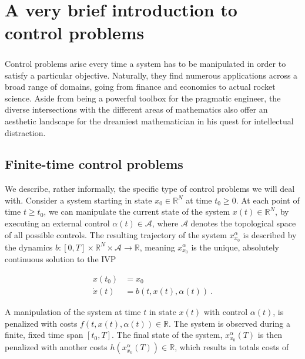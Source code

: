 \chapter{A very brief introduction to control problems} 

	\paragraph{}
	Control problems arise every time a system has to be manipulated in order to satisfy a particular objective. Naturally, they find numerous applications across a broad range of domains, going from finance and economics to actual rocket science. Aside from being a powerful toolbox for the pragmatic engineer, the diverse intersections with the different areas of mathematics also offer an aesthetic landscape for the dreamiest mathematician in his quest for intellectual distraction. 
	
	\section{Finite-time control problems}
	
	We describe, rather informally, the specific type of control problems we will deal with. Consider a system starting in state $ x_0 \in \mathbb{R}^N $ at time $ t_0 \geq 0 $. At each point of time $ t \geq t_0 $, we can manipulate the current state of the system $ x(t) \in \mathbb{R}^N $, by executing an external control $ \alpha(t) \in \mathcal{A} $, where $ \mathcal{A} $ denotes the topological space of all possible controls. The resulting trajectory of the system $ x^{\alpha}_{x_0} $ is described by the dynamics $ b : \left[ 0 , T \right] \times \mathbb{R}^N \times \mathcal{A} \to \mathbb{R} $, meaning $ x^{\alpha}_{x_0} $ is the unique, absolutely continuous solution to the IVP
	
	\begin{align*}
	x(t_0) &= x_0 \\
	\dot{x}(t) &= b(t, x(t), \alpha(t)) \ .
	\end{align*}
	
	A manipulation of the system at time $ t $ in state $ x(t) $ with control $ \alpha(t) $, is penalized with costs $ f(t, x(t), \alpha(t)) \in \mathbb{R} $. The system is observed during a finite, fixed time span $ \left[t_0, T \right] $. The final state of the system, $ x^{\alpha}_{x_0}(T) $ is then penalized with another costs $ h(x^{\alpha}_{x_0}(T)) \in \mathbb{R} $, which results in totals costs of
	
